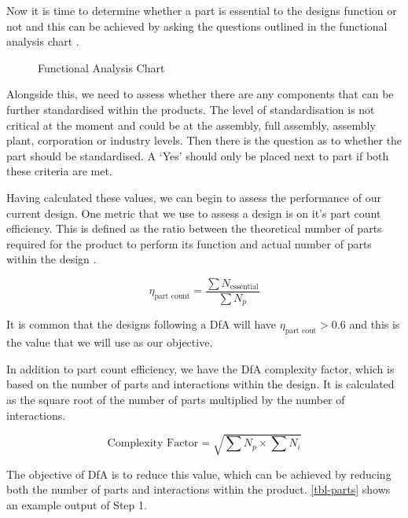 Now it is time to determine whether a part is essential to the designs function or not and this can be achieved by asking the questions outlined in the functional analysis chart . 

\begin{figure}[h!]
    \centering
    
    \vspace{1em}
    \caption{Functional Analysis Chart}\label{fig-functional}
\end{figure}

Alongside this, we need to assess whether there are any components that can be further standardised within the products. The level of standardisation is not critical at the moment and could be at the assembly, full assembly, assembly plant, corporation or industry levels. Then there is the question as to whether the part should be standardised. A `Yes' should only be placed next to part if both these criteria are met.

Having calculated these values, we can begin to assess the performance of our current design. One metric that we use to assess a design is on it's part count efficiency. This is defined as the ratio between the theoretical number of parts required for the product to perform its function and actual number of parts within the design .

\begin{equation}
    \eta_{\text{part count}} = \frac{\sum{N_\text{essential}}}{\sum{N_p}}
    \label{equ-part-eff}
\end{equation}

It is common that the designs following a DfA will have $\eta_{\text{part cout}}>0.6$ and this is the value that we will use as our objective.

In addition to part count efficiency, we have the \ac{DfA} complexity factor, which is based on the number of parts and interactions within the design. It is calculated as the square root of the number of parts multiplied by the number of interactions.

\begin{equation}
    \text{Complexity Factor} = \sqrt{\sum{N_p}\times\sum{N_i}}
\end{equation} 


The objective of \ac{DfA} is to reduce this value, which can be achieved by reducing both the number of parts and interactions within the product. \cref{tbl-parts} shows an example output of Step 1.

